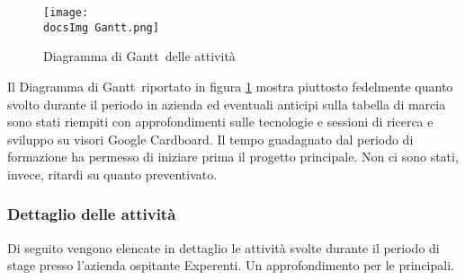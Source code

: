 \begin{figure}[H]
	\centering
	\texttt{[image: \\docsImg Gantt.png]}
	\caption{Diagramma di Gantt\gloss\ delle attivit\`a}
	\label{fig:Diagramma di Gantt delle attivita}
\end{figure}
\noindent
Il Diagramma di Gantt\gloss\ riportato in figura \ref{fig:Diagramma di Gantt delle attivita} mostra piuttosto fedelmente quanto svolto durante il periodo in azienda ed eventuali anticipi sulla tabella di marcia sono stati riempiti con approfondimenti sulle tecnologie e sessioni di ricerca e sviluppo su visori Google Cardboard. Il tempo guadagnato dal periodo di formazione ha permesso di iniziare prima il progetto principale. Non ci sono stati, invece, ritardi su quanto preventivato.

\subsubsection{Dettaglio delle attivit\`a}
Di seguito vengono elencate in dettaglio le attivit\`a svolte durante il periodo di stage presso l'azienda ospitante Experenti. Un approfondimento per le principali. 

